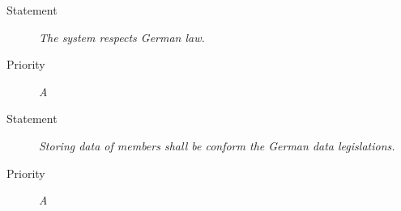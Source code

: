 \NFR
\begin{description}
\item[Statement] \textit{The system respects German law.}
\item[Priority] \textit{A}
\end{description}

\NFR
\begin{description}
\item [Statement] \textit{Storing data of members shall be conform the German
    data legislations.}
\item [Priority] \textit{A}
\end{description}
